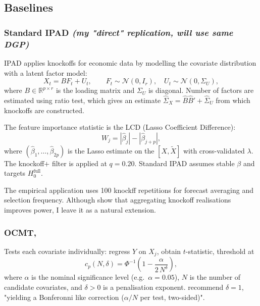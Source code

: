 \documentclass[12pt, a4paper]{article}
\begin{document}
\subsection{Baselines}
\subsubsection{Standard IPAD \citep{fan2020ipad} \textit{(my "direct" replication, will use same DGP)}}
 
IPAD  applies knockoffs for economic data by modelling the covariate distribution with a latent factor model:
\begin{equation}
    X_t = BF_t + U_t, \qquad F_t \sim \mathcal{N}(0, I_r), \quad U_t \sim \mathcal{N}(0, \Sigma_U),
\end{equation}
where $B \in \mathbb{R}^{p \times r}$ is the loading matrix and $\Sigma_U$ is diagonal. Number of factors are estimated using \citet{ahn2013} ratio test, which gives an estimate $\hat{\Sigma}_X = \hat{B}\hat{B}' + \hat{\Sigma}_U$ from which knockoffs are constructed.

The feature importance statistic is the LCD (Lasso Coefficient Difference):
\begin{equation}
    W_j = |\hat{\beta}_j| - |\hat{\beta}_{j+p}|,
\end{equation}
where $(\hat{\beta}_1, \ldots, \hat{\beta}_{2p})$ is the Lasso estimate on the $[X, \tilde{X}]$ with cross-validated $\lambda$.  The knockoff$+$ filter is applied at $q = 0.20$. Standard IPAD assumes stable $\beta$ and targets $H_0^{\text{full}}$.

The empirical application uses 100 knockff repetitions for forecast averaging and selection frequency. Although \citet{nguyen2020} show that aggregating knockoff realisations improves power, I leave it as a natural extension.

\subsubsection{OCMT, \citet{chudik2018, chudik2024ocmt}}

Tests each covariate individually: regress $Y$ on $X_j$, obtain $t$-statistic, threshold at
$$c_p(N, \delta) = \Phi^{-1}\!\left(1 - \frac{\alpha}{2\,N^\delta}\right),$$
where $\alpha$ is the nominal significance level (e.g.\ $\alpha = 0.05$), $N$ is the number of candidate covariates, and $\delta > 0$ is a penalisation exponent. \citet{chudik2024ocmt} recommend $\delta = 1$, "yielding a Bonferonni like correction ($\alpha/N$ per test, two-sided)".
\end{document}
